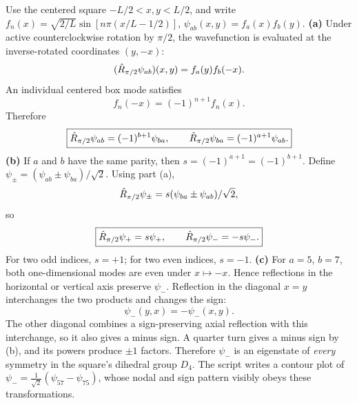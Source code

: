 Use the centered square $-L/2<x,y<L/2$,
and write
$f_n(x)=\sqrt{2/L}\sin[n\pi(x/L-1/2)]$,
$\psi_{ab}(x,y)=f_a(x)f_b(y)$.
\textbf{(a)} Under active counterclockwise
rotation by $\pi/2$, the wavefunction
is evaluated at the inverse-rotated
coordinates $(y,-x)$:
\[
(\hat R_{\pi/2}\psi_{ab})(x,y)
=f_a(y)f_b(-x).
\]
An individual centered box mode
satisfies
\[
f_n(-x)=(-1)^{n+1}f_n(x).
\]
Therefore
\begin{equation}
\boxed{\hat R_{\pi/2}\psi_{ab}
=(-1)^{b+1}\psi_{ba},\qquad
\hat R_{\pi/2}\psi_{ba}
=(-1)^{a+1}\psi_{ab}.}
\end{equation}
\textbf{(b)} If $a$ and $b$ have
the same parity, then
$s=(-1)^{a+1}=(-1)^{b+1}$.
Define $\psi_\pm=(\psi_{ab}\pm\psi_{ba})/\sqrt2$.
Using part (a),
\[
\hat R_{\pi/2}\psi_\pm=
s(\psi_{ba}\pm\psi_{ab})/\sqrt2,
\]
so
\begin{equation}
\boxed{\hat R_{\pi/2}\psi_+=s\psi_+,\qquad
\hat R_{\pi/2}\psi_-=-s\psi_-.}
\end{equation}
For two odd indices, $s=+1$;
for two even indices, $s=-1$.
\textbf{(c)} For $a=5$, $b=7$,
both one-dimensional modes are even
under $x\mapsto-x$.
Hence reflections in the
horizontal or vertical axis preserve
$\psi_-$. Reflection in the
diagonal $x=y$ interchanges the
two products and changes the sign:
\[
\psi_-(y,x)=-\psi_-(x,y).
\]
The other diagonal combines a
sign-preserving axial reflection
with this interchange, so it also
gives a minus sign.
A quarter turn gives a minus sign
by (b), and its powers produce
$\pm1$ factors. Therefore $\psi_-$
is an eigenstate of \emph{every}
symmetry in the square's dihedral
group $D_4$.
The script writes a contour plot of
$\psi_-=\frac1{\sqrt2}(\psi_{57}-\psi_{75})$,
whose nodal and sign pattern visibly
obeys these transformations.

